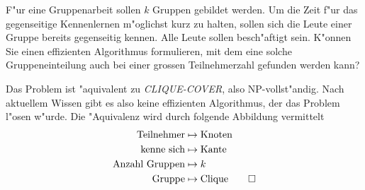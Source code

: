 F"ur eine Gruppenarbeit sollen $k$ Gruppen gebildet werden.
Um die Zeit f"ur das gegenseitige Kennenlernen m"oglichst
kurz zu halten, sollen sich die Leute einer Gruppe bereits
gegenseitig kennen. Alle Leute sollen besch"aftigt sein.
K"onnen Sie einen effizienten Algorithmus
formulieren, mit dem eine solche Gruppeneinteilung auch bei
einer grossen Teilnehmerzahl gefunden werden kann?

\begin{loesung}
Das Problem ist "aquivalent zu \textsl{CLIQUE-COVER}, also
NP-vollst"andig. Nach aktuellem Wissen gibt es also keine
effizienten Algorithmus, der das Problem l"osen w"urde. Die
"Aquivalenz wird durch folgende Abbildung vermittelt
\begin{align*}
\text{Teilnehmer}&\mapsto\text{Knoten}\\
\text{kenne sich}&\mapsto\text{Kante}\\
\text{Anzahl Gruppen}&\mapsto k\\
\text{Gruppe}&\mapsto\text{Clique}
\qedhere
\end{align*}
\end{loesung}

